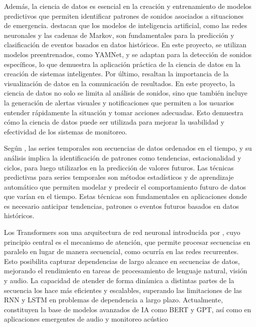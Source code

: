 Además, la ciencia de datos es esencial en la creación y entrenamiento de modelos predictivos que permiten identificar patrones de sonidos asociados a situaciones de emergencia. \citeauthor{russell_artificial_2022} \citeyear{russell_artificial_2022} destacan que los modelos de inteligencia artificial, como las redes neuronales y las cadenas de Markov, son fundamentales para la predicción y clasificación de eventos basados en datos históricos. En este proyecto, se utilizan modelos preentrenados, como YAMNet, y se adaptan para la detección de sonidos específicos, lo que demuestra la aplicación práctica de la ciencia de datos en la creación de sistemas inteligentes. Por último, \citeauthor{garcia_ciencia_2018} \citeyear{garcia_ciencia_2018} resaltan la importancia de la visualización de datos en la comunicación de resultados. En este proyecto, la ciencia de datos no solo se limita al análisis de sonidos, sino que también incluye la generación de alertas visuales y notificaciones que permiten a los usuarios entender rápidamente la situación y tomar acciones adecuadas. Esto demuestra cómo la ciencia de datos puede ser utilizada para mejorar la usabilidad y efectividad de los sistemas de monitoreo.


Según \citeauthor{hyndman_forecasting_2018} \citeyear{hyndman_forecasting_2018}, las series temporales son secuencias de datos ordenados en el tiempo, y su análisis implica la identificación de patrones como tendencias, estacionalidad y ciclos, para luego utilizarlos en la predicción de valores futuros. Las técnicas predictivas para series temporales son métodos estadísticos y de aprendizaje automático que permiten modelar y predecir el comportamiento futuro de datos que varían en el tiempo. Estas técnicas son fundamentales en aplicaciones donde es necesario anticipar tendencias, patrones o eventos futuros basados en datos históricos.


Los Transformers son una arquitectura de red neuronal introducida por \citeauthor{vaswani2017attention} \citeyear{vaswani2017attention}, cuyo principio central es el mecanismo de atención, que permite procesar secuencias en paralelo en lugar de manera secuencial, como ocurría en las redes recurrentes. Esto posibilita capturar dependencias de largo alcance en secuencias de datos, mejorando el rendimiento en tareas de procesamiento de lenguaje natural, visión y audio. La capacidad de atender de forma dinámica a distintas partes de la secuencia los hace más eficientes y escalables, superando las limitaciones de las RNN y LSTM en problemas de dependencia a largo plazo. Actualmente, constituyen la base de modelos avanzados de IA como BERT y GPT, así como en aplicaciones emergentes de audio y monitoreo acústico

